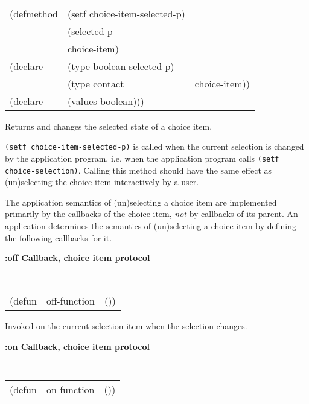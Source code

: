 {\samepage
\begin{flushright} \parbox[t]{6.125in}{
\tt
\begin{tabular}{lll}
\raggedright
(defmethod & (setf choice-item-selected-p) & \\
         & (selected-p \\
         & choice-item) \\
(declare &(type boolean  selected-p)\\
         &(type contact & choice-item))\\
(declare & (values boolean)))
\end{tabular}
\rm
}
\end{flushright}}

\begin{flushright} \parbox[t]{6.125in}{
Returns and changes the selected state of a choice item. 

{\tt (setf choice-item-selected-p)} is called when the current selection is
changed by the application program, i.e.  when the application program calls
{\tt (setf choice-selection)}.  Calling this method should have the same
effect as (un)selecting the choice item interactively by a user.}\end{flushright}


The application semantics of (un)selecting a choice item are implemented
primarily by the
callbacks of the choice item, {\em not} by callbacks of its parent. An
application determines the semantics of (un)selecting a choice item by defining
the following callbacks for it. 

{\samepage
{\large {\bf :off \hfill Callback, choice item protocol}} 
\begin{flushright} 
\parbox[t]{6.125in}{
\tt
\begin{tabular}{lll}
\raggedright
(defun & off-function & ())
\end{tabular}
\rm

}\end{flushright}}

\begin{flushright} \parbox[t]{6.125in}{
Invoked on the current selection item when the selection changes.

}\end{flushright}


{\samepage
{\large {\bf :on \hfill Callback, choice item protocol}} 
\begin{flushright} 
\parbox[t]{6.125in}{
\tt
\begin{tabular}{lll}
\raggedright
(defun & on-function & ())
\end{tabular}
\rm

}\end{flushright}}

